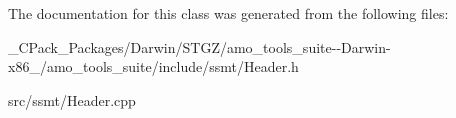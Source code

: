 The documentation for this class was generated from the following files\+:\begin{DoxyCompactItemize}
\item 
\+\_\+\+C\+Pack\+\_\+\+Packages/\+Darwin/\+S\+T\+G\+Z/amo\+\_\+tools\+\_\+suite-\/-\/\+Darwin-\/x86\+\_/amo\+\_\+tools\+\_\+suite/include/ssmt/Header.\+h\item 
src/ssmt/Header.\+cpp\end{DoxyCompactItemize}
